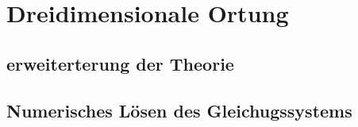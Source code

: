 \section{Dreidimensionale Ortung} 
      \subsection{erweiterterung der Theorie}
      \subsection{Numerisches Lösen des Gleichugssystems}
